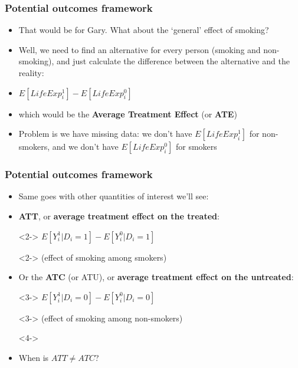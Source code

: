 \documentclass[aspectratio=43]{beamer}
\begin{document}
\begin{frame}
\frametitle{Potential outcomes framework}
\centering

\begin{itemize}
  \item<1-> That would be for Gary. What about the `general' effect of smoking?
  \item<2-> Well, we need to find an alternative for every person (smoking and non-smoking), and just calculate the difference between the alternative and the reality:
  \item<2->[] $E[LifeExp_{i}^{1}] - E[LifeExp_{i}^{0}]$
  \item<2->[] which would be the \textbf{Average Treatment Effect} (or \textbf{ATE})
  \item<3-> Problem is we have missing data: we don't have $E[LifeExp_{i}^{1}]$ for non-smokers, and we don't have $E[LifeExp_{i}^{0}]$ for smokers
\end{itemize}

\end{frame}

\begin{frame}
\frametitle{Potential outcomes framework}
\centering

\begin{itemize}
  \item<1-> Same goes with other quantities of interest we'll see:
  \item<2-> \textbf{ATT}, or \textbf{average treatment effect on the treated}:
  \item[]<2-> $E[Y_{i}^{1}|D_{i} = 1] - E[Y_{i}^{0}|D_{i} = 1]$
  \item[]<2-> {\small (effect of smoking among smokers)}
  \item<3-> Or the \textbf{ATC} (or ATU), or \textbf{average treatment effect on the untreated}:
  \item[]<3-> $E[Y_{i}^{1}|D_{i} = 0] - E[Y_{i}^{0}|D_{i} = 0]$
  \item[]<3-> {\small (effect of smoking among non-smokers)}
  \item[]<4->
  \item<4-> When is $ATT \neq ATC$?
\end{itemize}

\end{frame}
\end{document}
